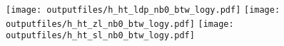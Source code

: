 \documentclass[11pt]{article}
\begin{document}
    \noindent
    \texttt{[image: outputfiles/h\_ht\_ldp\_nb0\_btw\_logy.pdf]}
    \texttt{[image: outputfiles/h\_ht\_zl\_nb0\_btw\_logy.pdf]}
    \texttt{[image: outputfiles/h\_ht\_sl\_nb0\_btw\_logy.pdf]}















\end{document}
